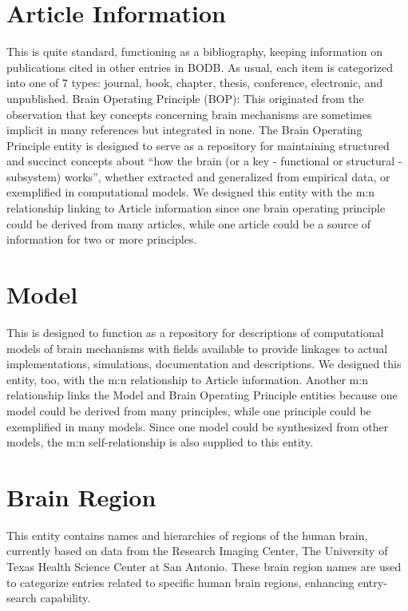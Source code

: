 \documentclass[letterpaper,10pt,english]{sphinxmanual}
\begin{document}
\section{Article Information}
\label{conceptual_overview:article-information}
This is quite standard, functioning as a bibliography, keeping information on publications cited in other entries in BODB. As usual, each item is categorized into one of 7 types: journal, book, chapter, thesis, conference, electronic, and unpublished. Brain Operating Principle (BOP): This originated from the observation that key concepts concerning brain mechanisms are sometimes implicit in many references but integrated in none. The Brain Operating Principle entity is designed to serve as a repository for maintaining structured and succinct concepts about “how the brain (or a key - functional or structural - subsystem) works”, whether extracted and generalized from empirical data, or exemplified in computational models. We designed this entity with the m:n relationship linking to Article information since one brain operating principle could be derived from many articles, while one article could be a source of information for two or more principles.


\section{Model}
\label{conceptual_overview:model}
This is designed to function as a repository for descriptions of computational models of brain mechanisms with fields available to provide linkages to actual implementations, simulations, documentation and descriptions. We designed this entity, too, with the m:n relationship to Article information. Another m:n relationship links the Model and Brain Operating Principle entities because one model could be derived from many principles, while one principle could be exemplified in many models. Since one model could be synthesized from other models, the m:n self-relationship is also supplied to this entity.


\section{Brain Region}
\label{conceptual_overview:brain-region}
This entity contains names and hierarchies of regions of the human brain, currently based on data from the Research Imaging Center, The University of Texas Health Science Center at San Antonio. These brain region names are used to categorize entries related to specific human brain regions, enhancing entry-search capability.
\end{document}
